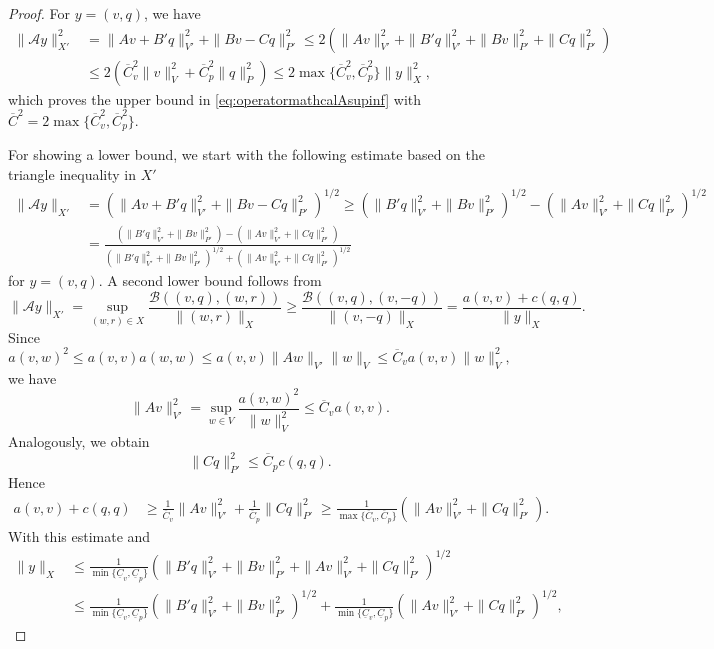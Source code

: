 \begin{proof}
For $y=(v, q)$, we have
\begin{align*}
\|\mathcal Ay\|_{X'}^2  & = \|Av+B'q\|_{V'}^2 + \|Bv-Cq\|_{P'}^2 \leq 2(\|Av\|_{V'}^2 + \|B'q\|_{V'}^2 + \|Bv\|_{P'}^2 + \|Cq\|_{P'}^2) \\
&\leq 2(\overline{C}_v^2\|v\|_V^2 + \overline{C}_p^2\|q\|_P^2)\leq 2\max\{\overline{C}_v^2, \overline{C}_p^2\}\|y\|_X^2,
\end{align*}
which proves the upper bound in \eqref{eq:operatormathcalAsupinf} with $\overline{C}^2=2\max\{\overline{C}_v^2, \overline{C}_p^2\}$.

For showing a lower bound, we start with the following estimate based on the triangle inequality in $X'$
\begin{align*}
\|\mathcal Ay\|_{X'}  & = \left(\|Av+B'q\|_{V'}^2 + \|Bv-Cq\|_{P'}^2\right)^{1/2} \geq \left(\|B'q\|_{V'}^2 + \|Bv\|_{P'}^2\right)^{1/2} - \left(\|Av\|_{V'}^2 + \|Cq\|_{P'}^2\right)^{1/2} \\
&=\frac{\left(\|B'q\|_{V'}^2 + \|Bv\|_{P'}^2\right) - \left(\|Av\|_{V'}^2 + \|Cq\|_{P'}^2\right)}{\left(\|B'q\|_{V'}^2 + \|Bv\|_{P'}^2\right)^{1/2} + \left(\|Av\|_{V'}^2 + \|Cq\|_{P'}^2\right)^{1/2}}
\end{align*}
for $y=(v, q)$.
A second lower bound follows from
\[
\|\mathcal Ay\|_{X'}=\sup_{(w,r)\in X}\frac{\mathcal B((v,q), (w,r))}{\|(w,r)\|_{X}}\geq \frac{\mathcal B((v,q), (v,-q))}{\|(v,-q)\|_{X}} = \frac{a(v,v)+c(q, q)}{\|y\|_{X}}.
\]
Since
\[
a(v,w)^2\leq a(v,v)a(w,w)\leq a(v,v)\|Aw\|_{V'}\|w\|_{V}\leq\overline{C}_va(v,v)\|w\|_{V}^2,
\]
we have
\[
\|Av\|_{V'}^2=\sup_{w\in V}\frac{a(v,w)^2}{\|w\|_V^2}\leq\overline{C}_va(v,v).
\]
Analogously, we obtain
\[
\|Cq\|_{P'}^2\leq\overline{C}_pc(q,q).
\]
Hence
\begin{align*}
a(v,v) + c(q,q)  & \geq \frac{1}{\overline{C}_v}\|Av\|_{V'}^2 + \frac{1}{\overline{C}_p}\|Cq\|_{P'}^2\geq \frac{1}{\max\{\overline{C}_v, \overline{C}_p\}}(\|Av\|_{V'}^2+\|Cq\|_{P'}^2).
\end{align*}
With this estimate and
\begin{align*}
\|y\|_X&\leq\frac{1}{\min\{\underline{C}_v,\underline{C}_p\}}\left(\|B'q\|_{V'}^2 + \|Bv\|_{P'}^2+\|Av\|_{V'}^2 + \|Cq\|_{P'}^2\right)^{1/2} \\
&\leq\frac{1}{\min\{\underline{C}_v,\underline{C}_p\}}\left(\|B'q\|_{V'}^2 + \|Bv\|_{P'}^2\right)^{1/2} + \frac{1}{\min\{\underline{C}_v,\underline{C}_p\}}\left(\|Av\|_{V'}^2 + \|Cq\|_{P'}^2\right)^{1/2},
\end{align*}

\end{proof}
